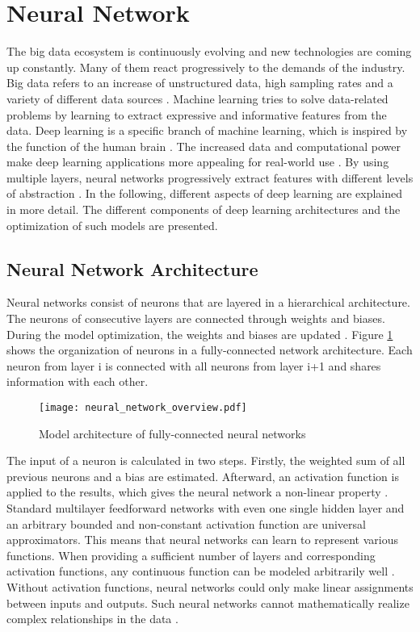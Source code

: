 \section{Neural Network}
The big data ecosystem is continuously evolving and new technologies are coming up constantly. Many of them react progressively to the demands of the industry. Big data refers to an increase of unstructured data, high sampling rates and a variety of different data sources \cite{Sagiroglu2013}. Machine learning tries to solve data-related problems by learning to extract expressive and informative features from the data. Deep learning is a specific branch of machine learning, which is inspired by the function of the human brain \cite{Calin2020}. The increased data and computational power make deep learning applications more appealing for real-world use \cite{ZHAO2019213}. By using multiple layers, neural networks progressively extract features with different levels of abstraction \cite{ZHAO2019213}. In the following, different aspects of deep learning are explained in more detail. The different components of deep learning architectures and the optimization of such models are presented. 

\subsection{Neural Network Architecture}
Neural networks consist of neurons that are layered in a hierarchical architecture. The neurons of consecutive layers are connected through weights and biases. During the model optimization, the weights and biases are updated \cite{ShilohPerl2020}. Figure \ref{fig:neural_network_overview} shows the organization of neurons in a fully-connected network architecture. Each neuron from layer i is connected with all neurons from layer i+1 and shares information with each other.

\begin{figure}[H]
  \centering
  \texttt{[image: neural\_network\_overview.pdf]}
  \caption {Model architecture of fully-connected neural networks}
  \label{fig:neural_network_overview}
\end{figure}
The input of a neuron is calculated in two steps. Firstly, the weighted sum of all previous neurons and a bias are estimated. Afterward, an activation function is applied to the results, which gives the neural network a non-linear property \cite{ShilohPerl2020}. Standard multilayer feedforward networks with even one single hidden layer and an arbitrary bounded and non-constant activation function are universal approximators. This means that neural networks can learn to represent various functions. When providing a sufficient number of layers and corresponding activation functions, any continuous function can be modeled arbitrarily well \cite{HORNIK1991}. Without activation functions, neural networks could only make linear assignments between inputs and outputs. Such neural networks cannot mathematically realize complex relationships in the data \cite{Ding2018}.

